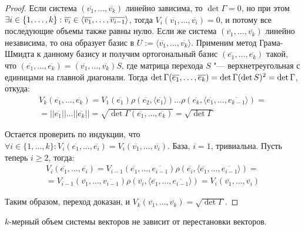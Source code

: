 \begin{proof}
	Если система $(\overline{v_1}, \dots, \overline{v_k})$ линейно зависима, то $\det{\Gamma} = 0$, но при этом $\exists i \in \{1, \dots, k\}: \overline{v_i} \hm{\in} \langle\overline{v_1}, \dots, \overline{v_{i - 1}}\rangle$, тогда $V_i(\overline{v_1}, \dots, \overline{v_i}) = 0$, и потому все последующие объемы также равны нулю. Если же система $(\overline{v_1}, \dots, \overline{v_k})$ линейно независима, то она образует базис в $U := \langle\overline{v_1}, \dots, \overline{v_k}\rangle$. Применим метод Грама-Шмидта к данному базису и получим ортогональный базис $(\overline{e_1}, \dots, \overline{e_k})$ такой, что $(\overline{e_1}, \dots, \overline{e_k}) = (\overline{v_1}, \dots, \overline{v_k})S$, где матрица перехода $S$ "--- верхнетреугольная с единицами на главной диагонали. Тогда $\det{\Gamma(\overline{e_1}, \dotsc, \overline{e_k})} \hm{=} \det{\Gamma}(\det{S})^2 = \det{\Gamma}$, откуда:
	\begin{multline*}
		V_k(\overline{e_1}, \dots, \overline{e_k}) = V_1(\overline{e_1})\rho(\overline{e_2}, \langle\overline{e_1}\rangle)\dots \rho(\overline{e_k}, \langle\overline{e_1}, \dots, \overline{e_{k - 1}}\rangle) =
		\\
		= ||\overline{e_1}||\dots||\overline{e_k}|| = \sqrt{\det{\Gamma(\overline{e_1}, \dotsc, \overline{e_k})}} = \sqrt{\det{\Gamma}}
	\end{multline*}
	
	Остается проверить по индукции, что $\forall i \in \{1, \dots, k\}: V_i(\overline{e_1}, \dots, \overline{e_i}) = V_i(\overline{v_1}, \dots, \overline{v_i})$. База, $i = 1$, тривиальна. Пусть теперь $i \ge 2$, тогда:
	\begin{multline*}
		V_i(\overline{e_1}, \dots, \overline{e_i}) = V_{i - 1}(\overline{e_1}, \dots, \overline{e_{i - 1}})\rho(\overline{e_i}, \langle\overline{e_1}, \dots, \overline{e_{i - 1}}\rangle) =\\
		= V_{i - 1}(\overline{v_1}, \dots, \overline{v_{i - 1}})\rho\left(\overline{v_i}, \langle\overline{e_1}, \dots, \overline{e_{i - 1}}\rangle\right) = V_i(\overline{v_1}, \dots, \overline{v_i})
	\end{multline*}
	
	Таким образом, переход доказан, и $V_k(\overline{v_1}, \dots, \overline{v_k}) = \sqrt{\det{\Gamma}}$.
\end{proof}

\begin{corollary}
	$k$-мерный объем системы векторов не зависит от перестановки векторов.
\end{corollary}

